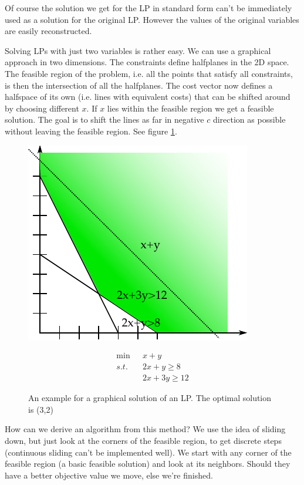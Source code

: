 Of course the solution we get for the LP in standard form can't be immediately used as a solution for the original LP. However the values of the original variables are easily reconstructed.

Solving LPs with just two variables is rather easy. We can use a graphical approach in two dimensions. The constraints define halfplanes in the 2D space. The feasible region of the problem, i.e. all the points that satisfy all constraints, is then the intersection of all the halfplanes. The cost vector now defines a halfspace of its own (i.e. lines with equivalent costs) that can be shifted around by choosing different $x$. If $x$ lies within the feasible region we get a feasible solution. The goal is to shift the lines as far in negative $c$ direction as possible without leaving the feasible region. See figure \ref{Fig:graphSolutionEx}.

\begin{figure}[hbt]
\begin{minipage}[hbt]{0.4\linewidth}
\includegraphics{./images/graphSolutionEx.pdf}
\end{minipage}
\hfill
\begin{minipage}[hbt]{0.4\linewidth}
\begin{align*}
\min & x+y\\
s.t.\quad&2x+y\geq 8\\
&2x+3y\geq 12
\end{align*}
\end{minipage}
\caption{An example for a graphical solution of an LP. The optimal solution is (3,2)}
\label{Fig:graphSolutionEx}
\end{figure}

How can we derive an algorithm from this method? We use the idea of sliding down, but just look at the corners of the feasible region, to get discrete steps (continuous sliding can't be implemented well). We start with any corner of the feasible region (a basic feasible solution) and look at its neighbors. Should they have a better objective value we move, else we're finished. 


